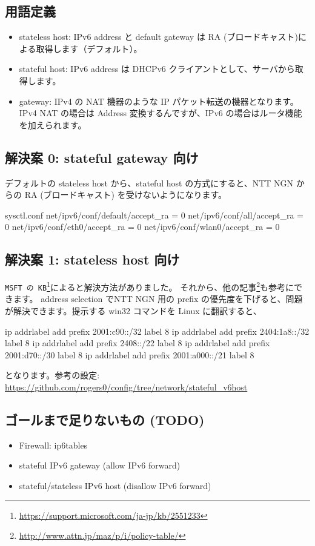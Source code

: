 \documentclass[mingoth,a4paper]{jsarticle}
\begin{document}
\subsection{用語定義}
\begin{itemize}
\item stateless host: IPv6 address と default gateway は RA (ブロードキャスト)による取得します（デフォルト）。
\item stateful host: IPv6 address は DHCPv6 クライアントとして、サーバから取得します。
\item gateway: IPv4 の NAT 機器のような IP パケット転送の機器となります。IPv4 NAT の場合は Address 変換するんですが、IPv6 の場合はルータ機能を加えられます。
\end{itemize}
\subsection{解決案 0: stateful gateway 向け}
デフォルトの stateless host から、stateful host の方式にすると、NTT NGN からの RA (ブロードキャスト) を受けないようになります。
\begin{commandline}
sysctl.conf
	net/ipv6/conf/default/accept_ra = 0
	net/ipv6/conf/all/accept_ra = 0
	net/ipv6/conf/eth0/accept_ra = 0
	net/ipv6/conf/wlan0/accept_ra = 0
\end{commandline}
\subsection{解決案 1: stateless host 向け}
{\tt MSFT の KB}\footnote{\url{https://support.microsoft.com/ja-jp/kb/2551233}}によると解決方法がありました。
それから、他の記事\footnote{\url{http://www.attn.jp/maz/p/i/policy-table/}}も参考にできます。
address selection でNTT NGN 用の prefix の優先度を下げると、問題が解決できます。提示する win32 コマンドを Linux に翻訳すると、
\begin{commandline}
	ip addrlabel add prefix 2001:c90::/32   label 8
	ip addrlabel add prefix 2404:1a8::/32   label 8
	ip addrlabel add prefix 2408::/22           label 8
	ip addrlabel add prefix 2001:d70::/30   label 8
	ip addrlabel add prefix 2001:a000::/21 label 8
\end{commandline}
となります。参考の設定: \url{https://github.com/rogers0/config/tree/network/stateful_v6host}
\subsection{ゴールまで足りないもの (TODO)}
\begin{itemize}
\item Firewall: ip6tables
\item stateful IPv6 gateway (allow IPv6 forward)
\item stateful/stateless IPv6 host (disallow IPv6 forward)
\end{itemize}
\end{document}
